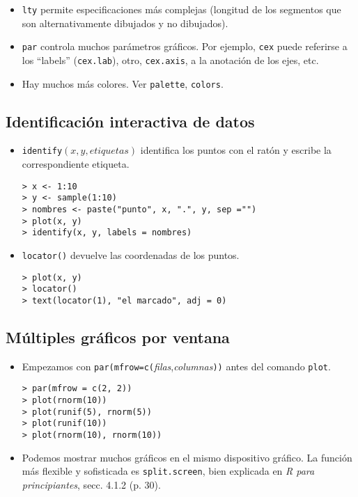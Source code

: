 \begin{itemize}
\newslide

\item \verb"lty" permite especificaciones más complejas
(longitud de los segmentos que son alternativamente dibujados y no dibujados).
\item \verb"par" controla muchos parámetros gráficos.
Por ejemplo, \verb"cex" puede referirse a los ``labels'' (\verb"cex.lab"),
otro, \verb"cex.axis", a la anotación de los ejes, etc.
\item Hay muchos más colores. Ver \verb"palette", \verb"colors".

\end{itemize}

\newslide

\subsection{Identificación interactiva de datos}

\begin{itemize}
\item \verb"identify"$(x,y,\textit{etiquetas})$ identifica los puntos con el ratón
y escribe la correspondiente etiqueta.
\begin{verbatim}
> x <- 1:10
> y <- sample(1:10)
> nombres <- paste("punto", x, ".", y, sep ="")
> plot(x, y)
> identify(x, y, labels = nombres)
\end{verbatim}
\item \verb"locator()" devuelve las coordenadas de los puntos.
\begin{verbatim}
> plot(x, y)
> locator()
> text(locator(1), "el marcado", adj = 0)
\end{verbatim}
\end{itemize}

\newslide

\subsection{Múltiples gráficos por ventana}

\begin{itemize}
\item Empezamos con \verb"par(mfrow=c("\textit{filas},\textit{columnas}\verb"))"
antes del comando \verb"plot".
\begin{verbatim}
> par(mfrow = c(2, 2))
> plot(rnorm(10))
> plot(runif(5), rnorm(5))
> plot(runif(10))
> plot(rnorm(10), rnorm(10))
\end{verbatim}
\item Podemos mostrar muchos gráficos en el mismo dispositivo gráfico.
La función más flexible y sofisticada es \verb"split.screen",
bien explicada en \emph{R para principiantes}, secc. 4.1.2 (p. 30).
\end{itemize}

